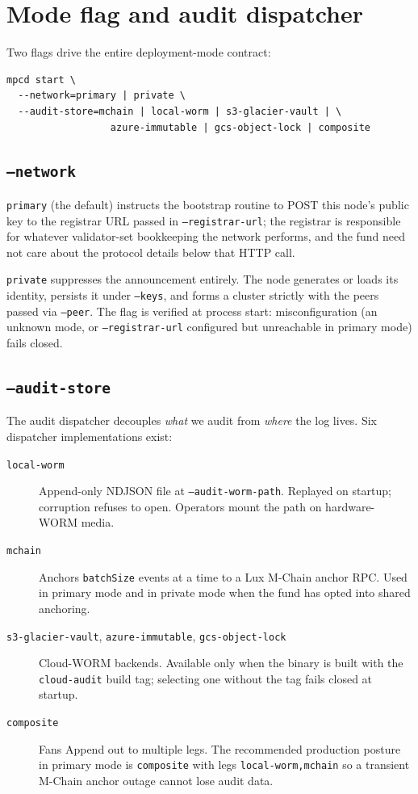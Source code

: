 \documentclass[11pt,a4paper]{article}
\begin{document}
\section{Mode flag and audit dispatcher}

Two flags drive the entire deployment-mode contract:

\begin{lstlisting}
mpcd start \
  --network=primary | private \
  --audit-store=mchain | local-worm | s3-glacier-vault | \
                  azure-immutable | gcs-object-lock | composite
\end{lstlisting}

\subsection{\texttt{--network}}

\texttt{primary} (the default) instructs the bootstrap routine to POST
this node's public key to the registrar URL passed in
\texttt{--registrar-url}; the registrar is responsible for whatever
validator-set bookkeeping the network performs, and the fund need not
care about the protocol details below that HTTP call.

\texttt{private} suppresses the announcement entirely. The node generates
or loads its identity, persists it under \texttt{--keys}, and forms a
cluster strictly with the peers passed via \texttt{--peer}. The flag is
verified at process start: misconfiguration (an unknown mode, or
\texttt{--registrar-url} configured but unreachable in primary mode)
fails closed.

\subsection{\texttt{--audit-store}}

The audit dispatcher decouples \emph{what} we audit from \emph{where} the
log lives. Six dispatcher implementations exist:

\begin{description}
  \item[\texttt{local-worm}] Append-only NDJSON file at
  \texttt{--audit-worm-path}. Replayed on startup; corruption refuses to
  open. Operators mount the path on hardware-WORM media.
  \item[\texttt{mchain}] Anchors \texttt{batchSize} events at a time to a
  Lux M-Chain anchor RPC. Used in primary mode and in private mode when
  the fund has opted into shared anchoring.
  \item[\texttt{s3-glacier-vault}, \texttt{azure-immutable},
  \texttt{gcs-object-lock}] Cloud-WORM backends. Available only when
  the binary is built with the \texttt{cloud-audit} build tag; selecting
  one without the tag fails closed at startup.
  \item[\texttt{composite}] Fans Append out to multiple legs. The
  recommended production posture in primary mode is
  \texttt{composite} with legs \texttt{local-worm,mchain} so a transient
  M-Chain anchor outage cannot lose audit data.
\end{description}
\end{document}
